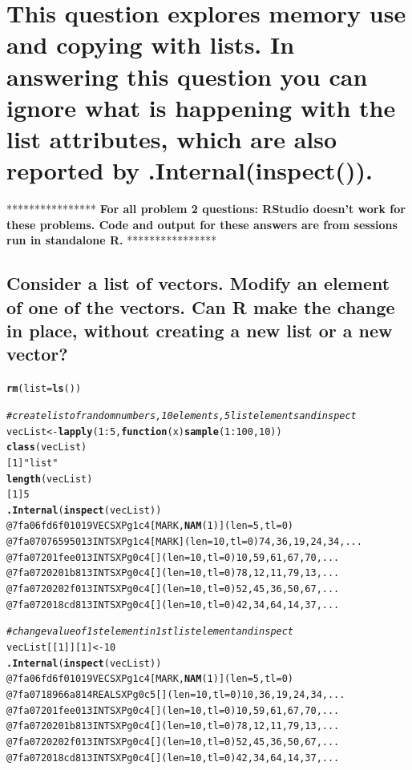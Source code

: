 \documentclass{article}\usepackage[]{graphicx}\usepackage[]{color}
\makeatletter
\newcommand{\hlstr}[1]{\textcolor[rgb]{0.192,0.494,0.8}{#1}}%
\newcommand{\hlcom}[1]{\textcolor[rgb]{0.678,0.584,0.686}{\textit{#1}}}%
\newcommand{\hlkwd}[1]{\textcolor[rgb]{0.737,0.353,0.396}{\textbf{#1}}}%
\newenvironment{kframe}{%
 \def\at@end@of@kframe{}%
 \ifinner\ifhmode%
  \def\at@end@of@kframe{\end{minipage}}%
  \begin{minipage}{\columnwidth}%
 \fi\fi%
 \def\FrameCommand##1{\hskip\@totalleftmargin \hskip-\fboxsep
 \colorbox{shadecolor}{##1}\hskip-\fboxsep
     \hskip-\linewidth \hskip-\@totalleftmargin \hskip\columnwidth}%
 \MakeFramed {\advance\hsize-\width
   \@totalleftmargin\z@ \linewidth\hsize
   \@setminipage}}%
 {\par\unskip\endMakeFramed%
 \at@end@of@kframe}
\newenvironment{knitrout}{}{} %
\makeatother
\begin{document}
\section{This question explores memory use and copying with lists. In answering this question you can ignore what is happening with the list attributes, which are also reported by .Internal(inspect()).} %

****************
\textbf{For all problem 2 questions: RStudio doesn't work for these problems. Code and output for these answers are from sessions run in standalone R.}
****************

\subsection{Consider a list of vectors. Modify an element of one of the vectors. Can R make the change in place, without creating a new list or a new vector?} %


\begin{knitrout}
\color{fgcolor}\begin{kframe}
\begin{alltt}
\hlkwd{rm}(list=\hlkwd{ls}())

\hlcom{#create list of random numbers, 10 elements, 5 list elements and inspect}
vecList <-\hlkwd{lapply}(1:5,\hlkwd{function}(x) \hlkwd{sample}(1:100,10))
\hlkwd{class}(vecList)
[1] \hlstr{"list"}
\hlkwd{length}(vecList)
[1] 5
\hlkwd{.Internal}(\hlkwd{inspect}(vecList))
@7fa06fd6f010 19 VECSXP g1c4 [MARK,\hlkwd{NAM}(1)] (len=5, tl=0)
  @7fa070765950 13 INTSXP g1c4 [MARK] (len=10, tl=0) 74,36,19,24,34,...
  @7fa07201fee0 13 INTSXP g0c4 [] (len=10, tl=0) 10,59,61,67,70,...
  @7fa0720201b8 13 INTSXP g0c4 [] (len=10, tl=0) 78,12,11,79,13,...
  @7fa0720202f0 13 INTSXP g0c4 [] (len=10, tl=0) 52,45,36,50,67,...
  @7fa072018cd8 13 INTSXP g0c4 [] (len=10, tl=0) 42,34,64,14,37,...

\hlcom{#change value of 1st element in 1st list element and inspect}
vecList[[1]][1] <- 10
\hlkwd{.Internal}(\hlkwd{inspect}(vecList))
@7fa06fd6f010 19 VECSXP g1c4 [MARK,\hlkwd{NAM}(1)] (len=5, tl=0)
  @7fa0718966a8 14 REALSXP g0c5 [] (len=10, tl=0) 10,36,19,24,34,...
  @7fa07201fee0 13 INTSXP g0c4 [] (len=10, tl=0) 10,59,61,67,70,...
  @7fa0720201b8 13 INTSXP g0c4 [] (len=10, tl=0) 78,12,11,79,13,...
  @7fa0720202f0 13 INTSXP g0c4 [] (len=10, tl=0) 52,45,36,50,67,...
  @7fa072018cd8 13 INTSXP g0c4 [] (len=10, tl=0) 42,34,64,14,37,...
\end{alltt}
\end{kframe}
\end{knitrout}
\end{document}
